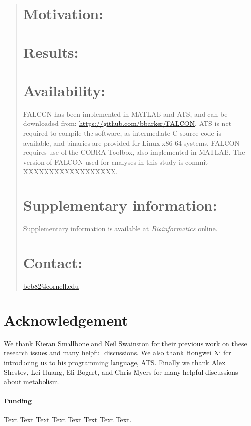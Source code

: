 \documentclass{bioinfo}
\begin{document}
\begin{abstract}

\section{Motivation:}
\falconAbstractMotivation

\section{Results:}
\falconAbstractResults

\section{Availability:}
FALCON has been implemented in MATLAB and ATS, and can be downloaded
from: \url{https://github.com/bbarker/FALCON}. ATS is not required to
compile the software, as intermediate C source code is available, and
binaries are provided for Linux x86-64 systems.  FALCON requires use
of the COBRA Toolbox, also implemented in MATLAB. The version of 
FALCON used for analyses in this study is commit XXXXXXXXXXXXXXXXXX.

\section{Supplementary information:}
Supplementary information is available at \emph{Bioinformatics}
online.

\section{Contact:} \href{beb82@cornell.edu}{beb82@cornell.edu}
\end{abstract}



\section*{Acknowledgement}
We thank Kieran Smallbone and Neil Swainston for their previous work
on these research issues and many helpful discussions. We also thank
Hongwei Xi for introducing us to his programming language,
ATS. Finally we thank Alex Shestov, Lei Huang, Eli Bogart, and Chris
Myers for many helpful discussions about metabolism.

\paragraph{Funding\textcolon} Text Text Text Text Text Text  Text Text.

%
%
%
%
%
%
%
%
%



\end{document}
